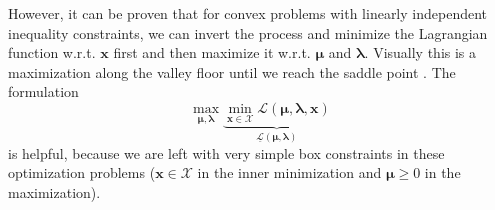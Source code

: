 However, it can be proven that for convex problems with linearly independent inequality constraints, we can invert the process and minimize the Lagrangian function w.r.t. $\mathbf{x}$ first and then maximize it w.r.t. $\pmb{\mu}$ and $\pmb{\lambda}$. Visually this is a maximization along the valley floor until we reach the saddle point \cite{Harzheim2014}. The formulation 
\begin{equation}
     \max_{\pmb{\mu},\pmb{\lambda}} \underbrace{\min_{\mathbf{x}\in \mathcal{X}} \mathcal{\mathcal{L}}(\pmb{\mu}, \pmb{\lambda}, \mathbf{x})}_{\underline{\mathcal{\mathcal{L}}} (\pmb{\mu}, \pmb{\lambda})}
\end{equation}
is helpful, because we are left with very simple box constraints in these optimization problems ($\mathbf{x} \in \mathcal{X}$ in the inner minimization and $\pmb{\mu} \ge 0$ in the maximization). 

